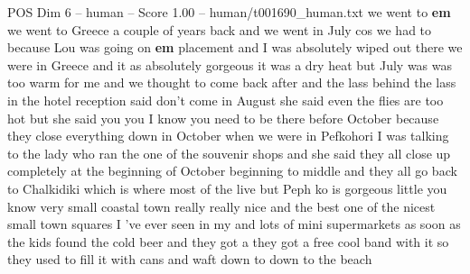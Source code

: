 \begin{textsample}{POS Dim 6 – human – Score 1.00 – human/t001690\_human.txt}  \label{ex:f6_pos_011}
we went to \textbf{em} we went to Greece a couple of years back and we went in July cos we had to because Lou was going on \textbf{em} placement and I was absolutely wiped out there we were in Greece and it as absolutely gorgeous it was a dry heat but July was was too warm for me and we thought to come back after and the lass behind the lass in the hotel reception said don't come in August she said even the flies are too hot but she said you you I know you need to be there before October because they close everything down in October when we were in Pefkohori I was talking to the lady who ran the one of the souvenir shops and she said they all close up completely at the beginning of October beginning to middle and they all go back to Chalkidiki which is where most of the live but Peph ko is gorgeous little you know very small coastal town really really nice and the best one of the nicest small town squares I 've ever seen in my and lots of mini supermarkets as soon as the kids found the cold beer and they got a they got a free cool band with it so they used to fill it with cans and waft down to down to the beach

\end{textsample}
